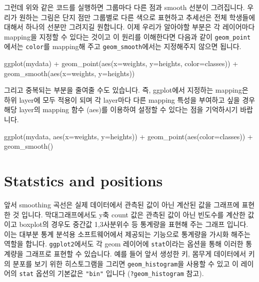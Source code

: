 \documentclass[
]{book}
\newenvironment{Shaded}{\begin{snugshade}}{\end{snugshade}}
\newcommand{\AttributeTok}[1]{\textcolor[rgb]{0.77,0.63,0.00}{#1}}
\newcommand{\FunctionTok}[1]{\textcolor[rgb]{0.00,0.00,0.00}{#1}}
\newcommand{\NormalTok}[1]{#1}
\newcommand{\SpecialCharTok}[1]{\textcolor[rgb]{0.00,0.00,0.00}{#1}}
\begin{document}
그런데 위와 같은 코드를 실행하면 그룹마다 다른 점과 smooth 선분이 그려집니다. 우리가 원하는 그림은 단지 점만 그룹별로 다른 색으로 표현하고 추세선은 전체 학생들에 대해서 하나의 선분만 그려지길 원합니다. 이제 우리가 알아야할 부분은 각 레이어마다 mapping을 지정할 수 있다는 것이고 이 원리를 이해한다면 다음과 같이 \texttt{geom\_point}에서는 \texttt{color}를 mapping해 주고 \texttt{geom\_smooth}에서는 지정해주지 않으면 됩니다.

\begin{Shaded}
\begin{Highlighting}[]
\FunctionTok{ggplot}\NormalTok{(mydata) }\SpecialCharTok{+}
  \FunctionTok{geom\_point}\NormalTok{(}\FunctionTok{aes}\NormalTok{(}\AttributeTok{x=}\NormalTok{weights, }\AttributeTok{y=}\NormalTok{heights, }\AttributeTok{color=}\NormalTok{classes)) }\SpecialCharTok{+}
  \FunctionTok{geom\_smooth}\NormalTok{(}\FunctionTok{aes}\NormalTok{(}\AttributeTok{x=}\NormalTok{weights, }\AttributeTok{y=}\NormalTok{heights))}
\end{Highlighting}
\end{Shaded}

그리고 중복되는 부분을 줄여줄 수도 있습니다. 즉, ggplot에서 지정하는 mapping은 하위 layer에 모두 적용이 되며 각 layer마다 다른 mapping 특성을 부여하고 싶을 경우 해당 layer의 mapping 함수 (aes)를 이용하여 설정할 수 있다는 점을 기억하시기 바랍니다.

\begin{Shaded}
\begin{Highlighting}[]
\FunctionTok{ggplot}\NormalTok{(mydata, }\FunctionTok{aes}\NormalTok{(}\AttributeTok{x=}\NormalTok{weights, }\AttributeTok{y=}\NormalTok{heights)) }\SpecialCharTok{+}
  \FunctionTok{geom\_point}\NormalTok{(}\FunctionTok{aes}\NormalTok{(}\AttributeTok{color=}\NormalTok{classes)) }\SpecialCharTok{+}
  \FunctionTok{geom\_smooth}\NormalTok{()}
\end{Highlighting}
\end{Shaded}

\hypertarget{statstics-and-positions}{%
\section{Statstics and positions}\label{statstics-and-positions}}

앞서 smoothing 곡선은 실제 데이터에서 관측된 값이 아닌 계산된 값을 그래프에 표현한 것 입니다. 막대그래프에서도 y축 count 값은 관측된 값이 아닌 빈도수를 계산한 값이고 boxplot의 경우도 중간값 1,3사분위수 등 통계량을 표현해 주는 그래프 입니다. 이는 대부분 통계 분석용 소프트웨어에서 제공되는 기능으로 통계량을 가시화 해주는 역할을 합니다. \texttt{ggplot2}에서도 각 geom 레이어에 \texttt{stat}이라는 옵션을 통해 이러한 통계량을 그래프로 표현할 수 있습니다. 예를 들어 앞서 생성한 키, 몸무게 데이터에서 키의 분포를 보기 위한 히스토그램을 그리면 \texttt{geom\_histogram}을 사용할 수 있고 이 레이어의 \texttt{stat} 옵션의 기본값은 \texttt{"bin"} 입니다 (\texttt{?geom\_histogram} 참고).
\end{document}

